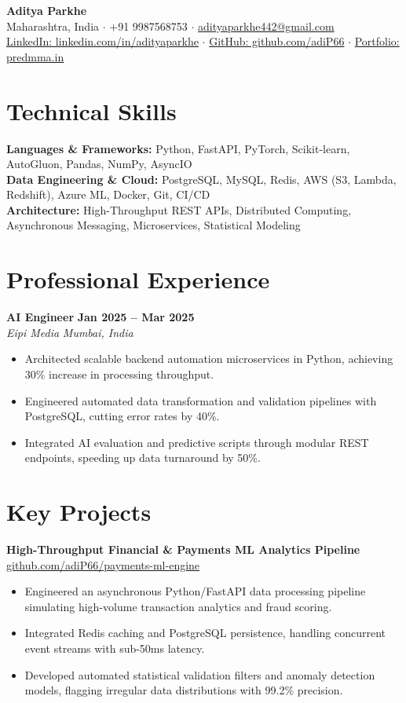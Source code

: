 \documentclass[10pt,a4paper]{article}
\begin{document}
\begin{center}
    {\LARGE \textbf{Aditya Parkhe}} \\[3pt]
    \small Maharashtra, India \; $\cdot$ \; +91 9987568753 \; $\cdot$ \; \href{mailto:adityaparkhe442@gmail.com}{adityaparkhe442@gmail.com} \\[2pt]
    \href{https://linkedin.com/in/adityaparkhe}{LinkedIn: linkedin.com/in/adityaparkhe} \; $\cdot$ \; \href{https://github.com/adiP66}{GitHub: github.com/adiP66} \; $\cdot$ \; \href{https://predmma.in}{Portfolio: predmma.in}
\end{center}

\section*{Technical Skills}
\textbf{Languages \& Frameworks:} Python, FastAPI, PyTorch, Scikit-learn, AutoGluon, Pandas, NumPy, AsyncIO \\
\textbf{Data Engineering \& Cloud:} PostgreSQL, MySQL, Redis, AWS (S3, Lambda, Redshift), Azure ML, Docker, Git, CI/CD \\
\textbf{Architecture:} High-Throughput REST APIs, Distributed Computing, Asynchronous Messaging, Microservices, Statistical Modeling

\section*{Professional Experience}
\textbf{AI Engineer} \hfill \textbf{Jan 2025 -- Mar 2025} \\
\textit{Eipi Media} \hfill \textit{Mumbai, India}
\begin{itemize}
    \item Architected scalable backend automation microservices in Python, achieving 30\% increase in processing throughput.
    \item Engineered automated data transformation and validation pipelines with PostgreSQL, cutting error rates by 40\%.
    \item Integrated AI evaluation and predictive scripts through modular REST endpoints, speeding up data turnaround by 50\%.
\end{itemize}

\section*{Key Projects}
\textbf{High-Throughput Financial \& Payments ML Analytics Pipeline} \hfill \href{https://github.com/adiP66}{github.com/adiP66/payments-ml-engine}
\begin{itemize}
    \item Engineered an asynchronous Python/FastAPI data processing pipeline simulating high-volume transaction analytics and fraud scoring.
    \item Integrated Redis caching and PostgreSQL persistence, handling concurrent event streams with sub-50ms latency.
    \item Developed automated statistical validation filters and anomaly detection models, flagging irregular data distributions with 99.2\% precision.
\end{itemize}
\end{document}
